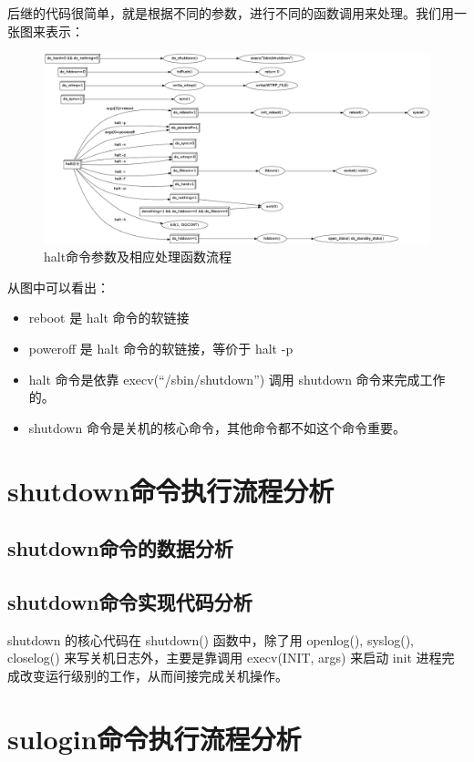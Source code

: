 后继的代码很简单，就是根据不同的参数，进行不同的函数调用来处理。我们用一张图来表示：

\begin{figure}[htbp]
\centering
\includegraphics{./figures/halt.png}
\caption{halt命令参数及相应处理函数流程}
\end{figure}

从图中可以看出：

\begin{itemize}
\item
  reboot 是 halt 命令的软链接
\item
  poweroff 是 halt 命令的软链接，等价于 halt -p
\item
  halt 命令是依靠 execv(``/sbin/shutdown'') 调用 shutdown
  命令来完成工作的。
\item
  shutdown 命令是关机的核心命令，其他命令都不如这个命令重要。
\end{itemize}
\section{shutdown命令执行流程分析}

\subsection{shutdown命令的数据分析}

\subsection{shutdown命令实现代码分析}

shutdown 的核心代码在 shutdown() 函数中，除了用 openlog(), syslog(),
closelog() 来写关机日志外，主要是靠调用 execv(INIT, args) 来启动 init
进程完成改变运行级别的工作，从而间接完成关机操作。

\section{sulogin命令执行流程分析}

